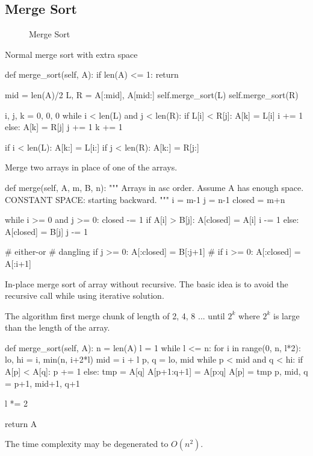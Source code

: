 \subsection{Merge Sort}
\begin{figure}[!htp]
\centering
{}
\caption{Merge Sort}
\label{fig:msort}
\end{figure}
 Normal merge sort with extra space
\begin{python}
def merge_sort(self, A):
  if len(A) <= 1:
    return

  mid = len(A)/2
  L, R = A[:mid], A[mid:]
  self.merge_sort(L)
  self.merge_sort(R)

  i, j, k = 0, 0, 0
  while i < len(L) and j < len(R):
    if L[i] < R[j]:
      A[k] = L[i]
      i += 1
    else:
      A[k] = R[j]
      j += 1
    k += 1

  if i < len(L):
    A[k:] = L[i:]
  if j < len(R):
    A[k:] = R[j:]
\end{python}

 Merge two arrays in place of one of the arrays.  
\begin{python}
def merge(self, A, m, B, n):
  """
  Arrays in asc order.
  Assume A has enough space.
  CONSTANT SPACE: starting backward. 
  """
  i = m-1
  j = n-1
  closed = m+n

  while i >= 0 and j >= 0:
    closed -= 1
    if A[i] > B[j]:
      A[closed] = A[i]
      i -= 1
    else:
      A[closed] = B[j]
      j -= 1

  # either-or
  # dangling
  if j >= 0: A[:closed] = B[:j+1]
  # if i >= 0: A[:closed] = A[:i+1]
\end{python}
In-place merge sort of array without recursive. The basic idea is to avoid the recursive call while using iterative solution.

The algorithm first merge chunk of length of 2, 4, 8 ... until $2^k$ where $2^k$ is large than the length of the array.
\begin{python}
def merge_sort(self, A):
  n = len(A)
  l = 1
  while l <= n:
    for i in range(0, n, l*2):
      lo, hi = i, min(n, i+2*l)
      mid = i + l
      p, q = lo, mid
      while p < mid and q < hi:
        if A[p] < A[q]:
          p += 1
        else:
          tmp = A[q]
          A[p+1:q+1] = A[p:q]
          A[p] = tmp
          p, mid, q = p+1, mid+1, q+1

    l *= 2

  return A
\end{python}
The time complexity may be degenerated to $O(n^2)$. 
